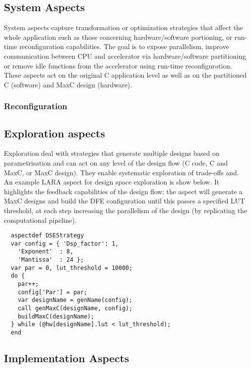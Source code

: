\subsection{System Aspects}

System aspects capture transformation or optimization strategies that
affect the whole application such as those concerning
hardware/software portioning, or run-time reconfiguration
capabilities. The goal is to expose parallelism, improve communication
between CPU and accelerator via hardware/software partitioning or
remove idle functions from the accelerator using run-time
reconfiguration. These aspects act on the original C application level
as well as on the partitioned C (software) and MaxC design (hardware).


\subsubsection{\TODO Reconfiguration}

\subsection{Exploration aspects}

Exploration deal with strategies that generate multiple designs based
on parametrisation and can act on any level of the design flow (C
code, C and MaxC, or MaxC design). They enable systematic exploration
of trade-offs and. An example LARA aspect for design space exploration
is show below. It highlights the feedback capabilities of the design
flow: the aspect will generate a MaxC designs and build the DFE
configuration until this passes a specified LUT threshold, at each
step increasing the parallelism of the design (by replicating the
computational pipeline).

\lstset{style=lara}
\begin{lstlisting}
  aspectdef DSEStrategy
  var config = { 'Dsp_factor': 1,
    'Exponent'  : 8,
    'Mantissa'  : 24 };
  var par = 0, lut_threshold = 10000;
  do {
    par++;
    config['Par'] = par;
    var designName = genName(config);
    call genMaxC(designName, config);
    buildMaxC(designName);
  } while (@hw[designName].lut < lut_threshold);
  end
\end{lstlisting}

\subsection{Implementation Aspects}

